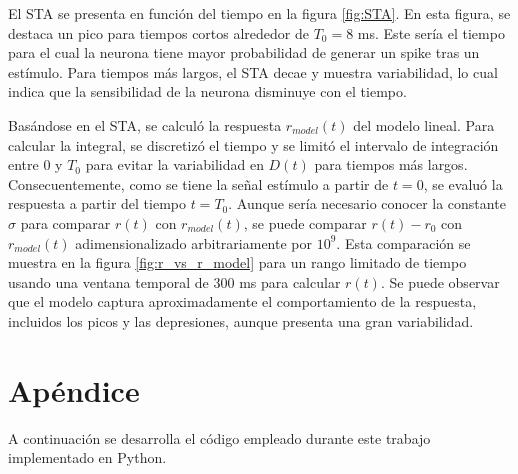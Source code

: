 \documentclass[aps,prb,twocolumn,superscriptaddress,floatfix,longbibliography]{revtex4-2}
\newcounter{para}
\begin{document}
El STA se presenta en función del tiempo en la figura \ref{fig:STA}. En esta figura, se destaca un pico para tiempos cortos alrededor de \( T_0 = 8 \) ms. Este sería el tiempo para el cual la neurona tiene mayor probabilidad de generar un spike tras un estímulo. Para tiempos más largos, el STA decae y muestra variabilidad, lo cual indica que la sensibilidad de la neurona disminuye con el tiempo.

Basándose en el STA, se calculó la respuesta  \( r_{model}(t) \) del modelo lineal. Para calcular la integral, se discretizó el tiempo y se limitó el intervalo de integración entre 0 y \( T_0 \) para evitar la variabilidad en \( D(t) \) para tiempos más largos. Consecuentemente, como se tiene la señal estímulo a partir de $t = 0$, se evaluó la respuesta a partir del tiempo \( t = T_0 \). Aunque sería necesario conocer la constante \( \sigma \) para comparar \( r(t) \) con \( r_{model}(t) \), se puede comparar \( r(t) - r_0 \) con \( r_{model}(t) \) adimensionalizado arbitrariamente por \( 10^9 \). Esta comparación se muestra en la figura \ref{fig:r_vs_r_model} para un rango limitado de tiempo usando una ventana temporal de 300 ms para calcular \( r(t) \). Se puede observar que el modelo captura aproximadamente el comportamiento de la respuesta, incluidos los picos y las depresiones, aunque presenta una gran variabilidad.


\onecolumngrid

\section{Apéndice}
A continuación se desarrolla el código empleado durante este trabajo implementado en Python.
\end{document}
